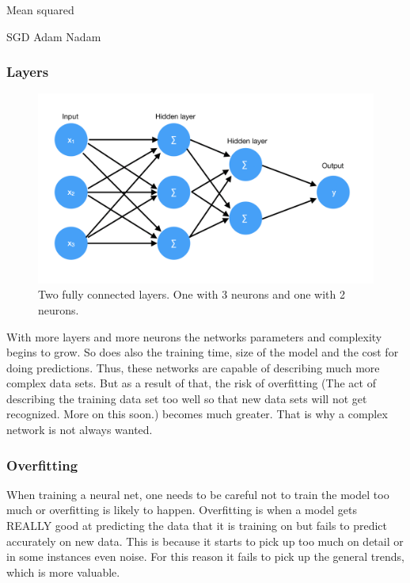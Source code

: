 Mean squared

SGD
Adam
Nadam

\subsubsection{Layers}

\begin{figure}[hbtp]
\begin{center}
\includegraphics[width = 1.0\textwidth]{./Images/fully_connected.jpg} 
\caption{Two fully connected layers. One with 3 neurons and one with 2 neurons.}
\end{center}
\end{figure}

With more layers and more neurons the networks parameters and complexity begins to grow. So does also the training time, size of the model and the cost for doing predictions. Thus, these networks are capable of describing much more complex data sets. But as a result of that, the risk of overfitting (The act of describing the training data set too well so that new data sets will not get recognized. More on this soon.) becomes much greater. That is why a complex network is not always wanted.

\subsubsection{Overfitting}
When training a neural net, one needs to be careful not to train the model too much or overfitting is likely to happen. Overfitting is when a model gets REALLY good at predicting the data that it is training on but fails to predict accurately on new data. This is because it starts to pick up too much on detail or in some instances even noise. For this reason it fails to pick up the general trends, which is more valuable. 

